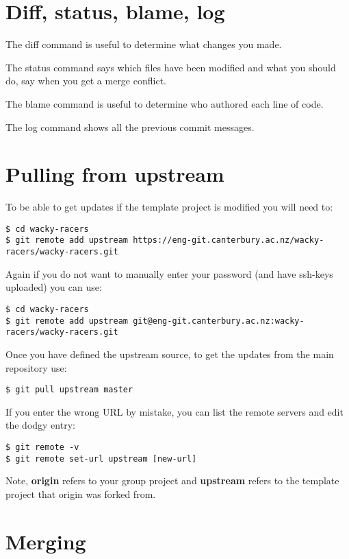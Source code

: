 \section{Diff, status, blame, log}

The diff command is useful to determine what changes you made.

The status command says which files have been modified and what you
should do, say when you get a merge conflict.

The blame command is useful to determine who authored each line of code.

The log command shows all the previous commit messages.


\section{Pulling from upstream}
\label{git-pulling-from-upstream}

To be able to get updates if the template project is modified you will
need to:

\begin{verbatim}
$ cd wacky-racers
$ git remote add upstream https://eng-git.canterbury.ac.nz/wacky-racers/wacky-racers.git
\end{verbatim}

Again if you do not want to manually enter your password (and have
ssh-keys uploaded) you can use:
%
\begin{verbatim}
$ cd wacky-racers
$ git remote add upstream git@eng-git.canterbury.ac.nz:wacky-racers/wacky-racers.git
\end{verbatim}

Once you have defined the upstream source, to get the updates from the
main repository use:
%
\begin{verbatim}
$ git pull upstream master
\end{verbatim}

If you enter the wrong URL by mistake, you can list the remote servers
and edit the dodgy entry:

\begin{verbatim}
$ git remote -v
$ git remote set-url upstream [new-url]
\end{verbatim}

Note, \textbf{origin} refers to your group project and \textbf{upstream}
refers to the template project that origin was forked from.

\section{Merging}
\label{git-merging}

